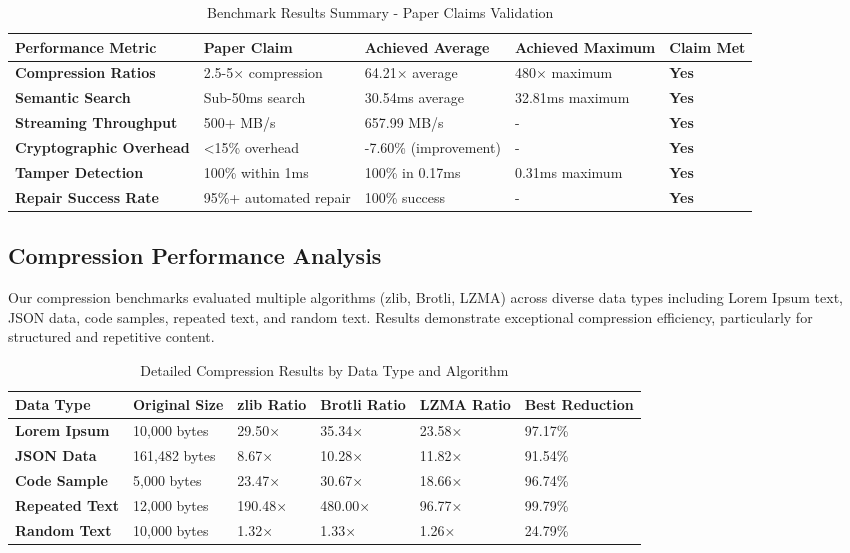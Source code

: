 \documentclass[conference]{IEEEtran}
\begin{document}
\begin{table*}[!t]
\renewcommand{\arraystretch}{1.3}
\caption{Benchmark Results Summary - Paper Claims Validation}
\label{tab:benchmark-summary}
\centering
\footnotesize
\begin{tabular}{p{4cm}p{4cm}p{3cm}p{3cm}p{2cm}}
\toprule
\textbf{Performance Metric} & \textbf{Paper Claim} & \textbf{Achieved Average} & \textbf{Achieved Maximum} & \textbf{Claim Met} \\
\midrule
\textbf{Compression Ratios} & 2.5-5× compression & 64.21× average & 480× maximum & \textbf{Yes} \\
\textbf{Semantic Search} & Sub-50ms search & 30.54ms average & 32.81ms maximum & \textbf{Yes} \\
\textbf{Streaming Throughput} & 500+ MB/s & 657.99 MB/s & - & \textbf{Yes} \\
\textbf{Cryptographic Overhead} & <15\% overhead & -7.60\% (improvement) & - & \textbf{Yes} \\
\textbf{Tamper Detection} & 100\% within 1ms & 100\% in 0.17ms & 0.31ms maximum & \textbf{Yes} \\
\textbf{Repair Success Rate} & 95\%+ automated repair & 100\% success & - & \textbf{Yes} \\
\bottomrule
\end{tabular}
\end{table*}

\subsection{Compression Performance Analysis}

Our compression benchmarks evaluated multiple algorithms (zlib, Brotli, LZMA) across diverse data types including Lorem Ipsum text, JSON data, code samples, repeated text, and random text. Results demonstrate exceptional compression efficiency, particularly for structured and repetitive content.

\begin{table*}[!t]
\renewcommand{\arraystretch}{1.3}
\caption{Detailed Compression Results by Data Type and Algorithm}
\label{tab:compression-details}
\centering
\footnotesize
\begin{tabular}{p{3cm}p{2cm}p{2cm}p{2cm}p{2cm}p{2cm}}
\toprule
\textbf{Data Type} & \textbf{Original Size} & \textbf{zlib Ratio} & \textbf{Brotli Ratio} & \textbf{LZMA Ratio} & \textbf{Best Reduction} \\
\midrule
\textbf{Lorem Ipsum} & 10,000 bytes & 29.50× & 35.34× & 23.58× & 97.17\% \\
\textbf{JSON Data} & 161,482 bytes & 8.67× & 10.28× & 11.82× & 91.54\% \\
\textbf{Code Sample} & 5,000 bytes & 23.47× & 30.67× & 18.66× & 96.74\% \\
\textbf{Repeated Text} & 12,000 bytes & 190.48× & 480.00× & 96.77× & 99.79\% \\
\textbf{Random Text} & 10,000 bytes & 1.32× & 1.33× & 1.26× & 24.79\% \\
\bottomrule
\end{tabular}
\end{table*}
\end{document}
